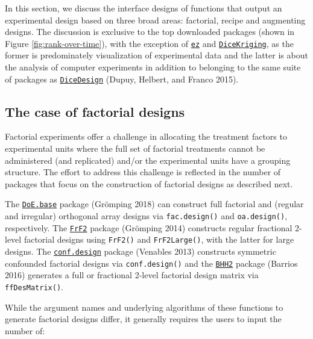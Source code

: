 \documentclass{article}
\begin{document}
In this section, we discuss the interface designs of functions that
output an experimental design based on three broad areas: factorial,
recipe and augmenting designs. The discussion is exclusive to the top
downloaded packages (shown in Figure \ref{fig:rank-over-time}), with the
exception of
\href{https://cran.r-project.org/web/packages/ez/index.html}{\texttt{ez}}
and
\href{https://cran.r-project.org/web/packages/DiceKriging/index.html}{\texttt{DiceKriging}},
as the former is predominately visualization of experimental data and
the latter is about the analysis of computer experiments in addition to
belonging to the same suite of packages as
\href{https://cran.r-project.org/web/packages/DiceDesign/index.html}{\texttt{DiceDesign}}
(Dupuy, Helbert, and Franco 2015).

\hypertarget{the-case-of-factorial-designs}{%
\subsection{The case of factorial
designs}\label{the-case-of-factorial-designs}}

Factorial experiments offer a challenge in allocating the treatment
factors to experimental units where the full set of factorial treatments
cannot be administered (and replicated) and/or the experimental units
have a grouping structure. The effort to address this challenge is
reflected in the number of packages that focus on the construction of
factorial designs as described next.

The
\href{https://cran.r-project.org/web/packages/DoE.base/index.html}{\texttt{DoE.base}}
package (Grömping 2018) can construct full factorial and (regular and
irregular) orthogonal array designs via \texttt{fac.design()} and
\texttt{oa.design()}, respectively. The
\href{https://cran.r-project.org/web/packages/FrF2/index.html}{\texttt{FrF2}}
package (Grömping 2014) constructs regular fractional 2-level factorial
designs using \texttt{FrF2()} and \texttt{FrF2Large()}, with the latter
for large designs. The
\href{https://cran.r-project.org/web/packages/conf.design/index.html}{\texttt{conf.design}}
package (Venables 2013) constructs symmetric confounded factorial
designs via \texttt{conf.design()} and the
\href{https://cran.r-project.org/web/packages/BHH2/index.html}{\texttt{BHH2}}
package (Barrios 2016) generates a full or fractional 2-level factorial
design matrix via \texttt{ffDesMatrix()}.

While the argument names and underlying algorithms of these functions to
generate factorial designs differ, it generally requires the users to
input the number of:
\end{document}
